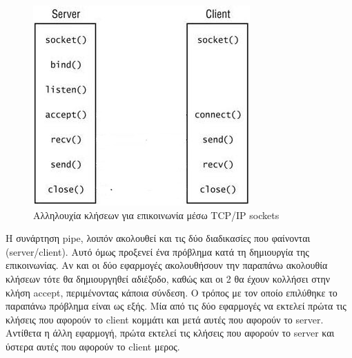 
\begin{figure}[htp]
\centering
\includegraphics[scale=0.7]{figures/Server_client_syscalls_tcp_ip_socket.jpg}
\caption{Αλληλουχία κλήσεων για επικοινωνία μέσω TCP/IP sockets \label{fig4_2}}
\end{figure}

Η συνάρτηση pipe, λοιπόν ακολουθεί και τις δύο διαδικασίες που φαίνονται
(server/client). Αυτό όμως προξενεί ένα πρόβλημα κατά τη δημιουργία της
επικοινωνίας. Αν και οι δύο εφαρμογές ακολουθήσουν την παραπάνω ακολουθία
κλήσεων τότε θα δημιουργηθεί αδιέξοδο, καθώς και οι 2 θα έχουν κολλήσει στην
κλήση accept, περιμένοντας κάποια σύνδεση. Ο τρόπος με τον οποίο επιλύθηκε το
παραπάνω πρόβλημα είναι ως εξής. Μία από τις δύο εφαρμογές να εκτελεί πρώτα τις
κλήσεις που αφορούν το client κομμάτι και μετά αυτές που αφορούν το server.
Αντίθετα η άλλη εφαρμογή, πρώτα εκτελεί τις κλήσεις που αφορούν το server και
ύστερα αυτές που αφορούν το client μερος. 


